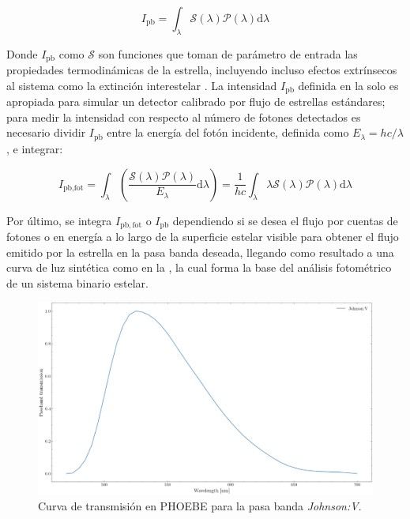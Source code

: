 \begin{eqfloat}
	\centering
	\begin{equation}
		I_{\textrm{pb}} = \int_{\lambda}{\mathcal{S}(\lambda) \mathcal{P}(\lambda)\textrm{d}\lambda}
	\end{equation}
	\blankcaption
	\label{ecuacionIntensidadPasabanda}
\end{eqfloat}

Donde $I_{\mathrm{pb}}$ como $\mathcal{S}$ son funciones que toman de parámetro
de entrada las propiedades termodinámicas de la estrella, incluyendo incluso
efectos extrínsecos al sistema como la extinción interestelar
\autocite{prsa_phoebe_increased_model_fidelity_mesh_2016}. La intensidad
$I_{\mathrm{pb}}$ definida en la  solo
es apropiada para simular un detector calibrado por flujo de estrellas
estándares; para medir la intensidad con respecto al número de fotones
detectados es necesario dividir $I_{\mathrm{pb}}$ entre la energía del fotón
incidente, definida como $E_{\lambda} = hc/\lambda$, e integrar:

\begin{eqfloat}
	\centering
	\begin{equation}
		I_{\textrm{pb}, \textrm{fot}} = \int_{\lambda}{\left(\frac{\mathcal{S}(\lambda) \mathcal{P}(\lambda)}{E_{\lambda}}\textrm{d}\lambda \right)} = \frac{1}{hc} \int_{\lambda}{\lambda \mathcal{S}(\lambda) \mathcal{P}(\lambda) \textrm{d}\lambda}
	\end{equation}
\end{eqfloat}

Por último, se integra $I_{\mathrm{pb}, \mathrm{fot}}$ o $I_{\mathrm{pb}}$\textemdash
dependiendo si se desea el flujo por cuentas de fotones o en energía\textemdash
a lo largo de la superficie estelar visible para obtener el flujo emitido por la
estrella en la pasa banda deseada, llegando como resultado a una curva de luz
sintética como en la , la cual
forma la base del análisis fotométrico de un sistema binario estelar.

\begin{figure}[!ht]
	\centering
	\includegraphics[scale=0.4]{Introduccion/Figures/Figura PHOEBE JohnsonV Pasabanda.png}
	\caption{Curva de transmisión en PHOEBE para la pasa banda \textit{Johnson:V}.}
	\label{figuraPhoebePasabandaJohnsonV}
\end{figure}

